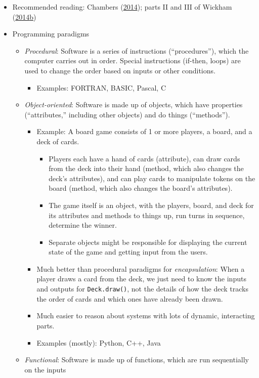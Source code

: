 \documentclass[
]{article}
\providecommand{\tightlist}{%
  \setlength{\itemsep}{0pt}\setlength{\parskip}{0pt}}
\begin{document}
\begin{itemize}
\item
  Recommended reading: Chambers (\protect\hyperlink{ref-ChambersObjectOrientedProgrammingFunctional2014}{2014}); parts II and III of Wickham (\protect\hyperlink{ref-WickhamAdvanced2014}{2014}\protect\hyperlink{ref-WickhamAdvanced2014}{b})
\item
  Programming paradigms

  \begin{itemize}
  \tightlist
  \item
    \emph{Procedural}: Software is a series of instructions (``procedures''), which the computer carries out in order. Special instructions (if-then, loops) are used to change the order based on inputs or other conditions.

    \begin{itemize}
    \tightlist
    \item
      Examples: FORTRAN, BASIC, Pascal, C
    \end{itemize}
  \item
    \emph{Object-oriented}: Software is made up of objects, which have properties (``attributes,'' including other objects) and do things (``methods'').

    \begin{itemize}
    \tightlist
    \item
      Example: A board game consists of 1 or more players, a board, and a deck of cards.

      \begin{itemize}
      \tightlist
      \item
        Players each have a hand of cards (attribute), can draw cards from the deck into their hand (method, which also changes the deck's attributes), and can play cards to manipulate tokens on the board (method, which also changes the board's attributes).\\
      \item
        The game itself is an object, with the players, board, and deck for its attributes and methods to things up, run turns in sequence, determine the winner.\\
      \item
        Separate objects might be responsible for displaying the current state of the game and getting input from the users.\\
      \end{itemize}
    \item
      Much better than procedural paradigms for \emph{encapsulation}: When a player draws a card from the deck, we just need to know the inputs and outputs for \texttt{Deck.draw()}, not the details of how the deck tracks the order of cards and which ones have already been drawn.
    \item
      Much easier to reason about systems with lots of dynamic, interacting parts.\\
    \item
      Examples (mostly): Python, C++, Java
    \end{itemize}
  \item
    \emph{Functional}: Software is made up of functions, which are run sequentially on the inputs


\end{itemize}
\end{itemize}
\end{document}
